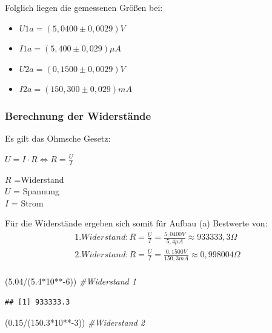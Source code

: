 \documentclass[
  9pt,
]{article}
\newenvironment{Shaded}{\begin{snugshade}}{\end{snugshade}}
\newcommand{\CommentTok}[1]{\textcolor[rgb]{0.56,0.35,0.01}{\textit{#1}}}
\newcommand{\DecValTok}[1]{\textcolor[rgb]{0.00,0.00,0.81}{#1}}
\newcommand{\FloatTok}[1]{\textcolor[rgb]{0.00,0.00,0.81}{#1}}
\newcommand{\NormalTok}[1]{#1}
\newcommand{\SpecialCharTok}[1]{\textcolor[rgb]{0.00,0.00,0.00}{#1}}
\begin{document}
Folglich liegen die gemessenen Größen bei:

\begin{itemize}
\item $U1a = (5,0400 \pm 0,0029)V$
\item $I1a = (5,400 \pm 0,029) \mu A$
\item $U2a = (0,1500 \pm 0,0029)V$
\item $I2a = (150,300 \pm 0,029) mA$
\end{itemize}

\hypertarget{berechnung-der-widerstuxe4nde}{%
\subsubsection{Berechnung der
Widerstände}\label{berechnung-der-widerstuxe4nde}}

Es gilt das Ohmsche Gesetz:

\(U=I\cdot R \Leftrightarrow R = \frac{U}{I}\)

\noindent \(R\) =Widerstand\\
\noindent \(U\) = Spannung\\
\noindent \(I\) = Strom

Für die Widerstände ergeben sich somit für Aufbau (a) Bestwerte von:
\begin{equation*}
\begin{split}
1. Widerstand: R=\frac{U}{I} = \frac {5,0400V}{5,4 \mu A} \approx 933333,3 \Omega \\
2.Widerstand: R=\frac{U}{I} = \frac {0,1500V}{150,3 mA} \approx 0,998004 \Omega \\
\end{split}
\end{equation*}

\begin{Shaded}
\begin{Highlighting}[]
\NormalTok{(}\FloatTok{5.04}\SpecialCharTok{/}\NormalTok{(}\FloatTok{5.4}\SpecialCharTok{*}\DecValTok{10}\SpecialCharTok{**{-}}\DecValTok{6}\NormalTok{)) }\CommentTok{\#Widerstand 1}
\end{Highlighting}
\end{Shaded}

\begin{verbatim}
## [1] 933333.3
\end{verbatim}

\begin{Shaded}
\begin{Highlighting}[]
\NormalTok{(}\FloatTok{0.15}\SpecialCharTok{/}\NormalTok{(}\FloatTok{150.3}\SpecialCharTok{*}\DecValTok{10}\SpecialCharTok{**{-}}\DecValTok{3}\NormalTok{)) }\CommentTok{\#Widerstand 2}
\end{Highlighting}
\end{Shaded}
\end{document}
